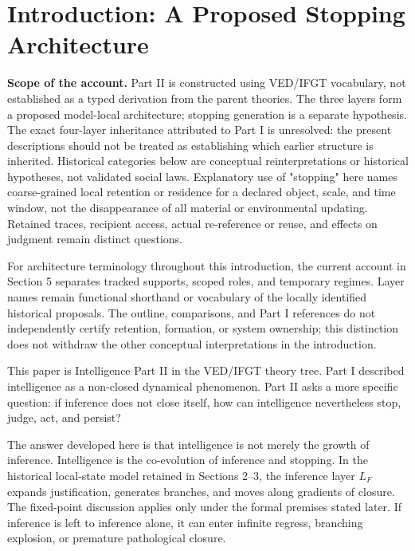 \section{Introduction: A Proposed Stopping Architecture}

\noindent\textbf{Scope of the account.} Part II is constructed using VED/IFGT vocabulary, not established as a typed derivation from the parent theories. The three layers form a proposed model-local architecture; stopping generation is a separate hypothesis. The exact four-layer inheritance attributed to Part I is unresolved: the present descriptions should not be treated as establishing which earlier structure is inherited. Historical categories below are conceptual reinterpretations or historical hypotheses, not validated social laws. Explanatory use of "stopping" here names coarse-grained local retention or residence for a declared object, scale, and time window, not the disappearance of all material or environmental updating. Retained traces, recipient access, actual re-reference or reuse, and effects on judgment remain distinct questions.

For architecture terminology throughout this introduction, the current account in Section 5 separates tracked supports, scoped roles, and temporary regimes. Layer names remain functional shorthand or vocabulary of the locally identified historical proposals. The outline, comparisons, and Part I references do not independently certify retention, formation, or system ownership; this distinction does not withdraw the other conceptual interpretations in the introduction.


This paper is Intelligence Part II in the VED/IFGT theory tree. Part I described intelligence as a non-closed dynamical phenomenon. Part II asks a more specific question: if inference does not close itself, how can intelligence nevertheless stop, judge, act, and persist?

The answer developed here is that intelligence is not merely the growth of inference. Intelligence is the co-evolution of inference and stopping. In the historical local-state model retained in Sections 2--3, the inference layer $L_F$ expands justification, generates branches, and moves along gradients of closure. The fixed-point discussion applies only under the formal premises stated later. If inference is left to inference alone, it can enter infinite regress, branching explosion, or premature pathological closure.

